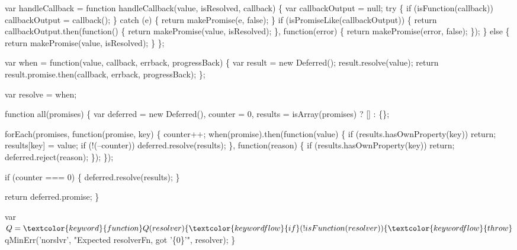 \begin{DoxyCodeInclude}
{{{{  var handleCallback = \textcolor{keyword}{function} handleCallback(value, isResolved, callback) \{
    var callbackOutput = null;
    \textcolor{keywordflow}{try} \{
      \textcolor{keywordflow}{if} (isFunction(callback)) callbackOutput = callback();
    \} \textcolor{keywordflow}{catch} (e) \{
      \textcolor{keywordflow}{return} makePromise(e, \textcolor{keyword}{false});
    \}
    \textcolor{keywordflow}{if} (isPromiseLike(callbackOutput)) \{
      \textcolor{keywordflow}{return} callbackOutput.then(\textcolor{keyword}{function}() \{
        \textcolor{keywordflow}{return} makePromise(value, isResolved);
      \}, \textcolor{keyword}{function}(error) \{
        \textcolor{keywordflow}{return} makePromise(error, \textcolor{keyword}{false});
      \});
    \} \textcolor{keywordflow}{else} \{
      \textcolor{keywordflow}{return} makePromise(value, isResolved);
    \}
  \};

  var when = \textcolor{keyword}{function}(value, callback, errback, progressBack) \{
    var result = \textcolor{keyword}{new} Deferred();
    result.resolve(value);
    \textcolor{keywordflow}{return} result.promise.then(callback, errback, progressBack);
  \};

  var resolve = when;

  \textcolor{keyword}{function} all(promises) \{
    var deferred = \textcolor{keyword}{new} Deferred(),
        counter = 0,
        results = isArray(promises) ? [] : \{\};

    forEach(promises, \textcolor{keyword}{function}(promise, key) \{
      counter++;
      when(promise).then(\textcolor{keyword}{function}(value) \{
        \textcolor{keywordflow}{if} (results.hasOwnProperty(key)) \textcolor{keywordflow}{return};
        results[key] = value;
        \textcolor{keywordflow}{if} (!(--counter)) deferred.resolve(results);
      \}, \textcolor{keyword}{function}(reason) \{
        \textcolor{keywordflow}{if} (results.hasOwnProperty(key)) \textcolor{keywordflow}{return};
        deferred.reject(reason);
      \});
    \});

    \textcolor{keywordflow}{if} (counter === 0) \{
      deferred.resolve(results);
    \}

    \textcolor{keywordflow}{return} deferred.promise;
  \}

  var $Q = \textcolor{keyword}{function} Q(resolver) \{
    \textcolor{keywordflow}{if} (!isFunction(resolver)) \{
      \textcolor{keywordflow}{throw} $qMinErr(\textcolor{stringliteral}{'norslvr'}, \textcolor{stringliteral}{"Expected resolverFn, got '\{0\}'"}, resolver);
    \}

}}}}
\end{DoxyCodeInclude}
